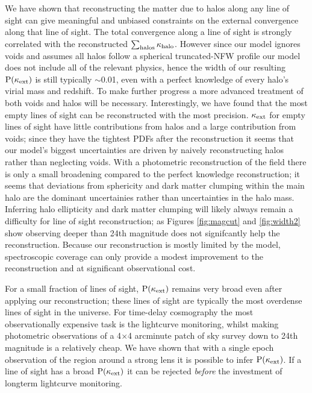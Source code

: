 \documentclass[useAMS,usenatbib]{mn2e}
\begin{document}
We have shown that reconstructing the matter due to halos along any line of sight can give meaningful and unbiased constraints on the external convergence along that line of sight. The total convergence along a line of sight is strongly correlated with the reconstructed $\sum_{\rm halos} \kappa_{\rm halo}$. However since our model ignores voids and assumes all halos follow a spherical truncated-NFW profile our model does not include all of the relevant physics, hence the width of our resulting ${\rm P}(\kappa_{\rm ext})$ is still typically $\sim$0.01, even with a perfect knowledge of every halo's virial mass and redshift. To make further progress a more advanced treatment of both voids and halos will be necessary. Interestingly, we have found that the most empty lines of sight can be reconstructed with the most precision. $\kappa_{\rm ext}$ for empty lines of sight have little contributions from halos and a large contribution from voids; since they have the tightest PDFs after the reconstruction it seems that our model's biggest uncertainties are driven by naively reconstructing halos rather than neglecting voids. With a photometric reconstruction of the field there is only a small broadening compared to the perfect knowledge reconstruction; it seems that deviations from sphericity and dark matter clumping within the main halo are the dominant uncertainies rather than uncertainties in the halo mass. Inferring halo ellipticity and dark matter clumping will likely always remain a difficulty for line of sight reconstruction; as Figures \ref{fig:magcut} and \ref{fig:width2} show observing deeper than 24th magnitude does not signifcantly help the reconstruction. Because our reconstruction is mostly limited by the model, spectroscopic coverage can only provide a modest improvement to the reconstruction and at significant observational cost.

For a small fraction of lines of sight, ${\rm P}(\kappa_{\rm ext})$ remains very broad even after applying our reconstruction; these lines of sight are typically the most overdense lines of sight in the universe. For time-delay cosmography the most observationally expensive task is the lightcurve monitoring, whilst making photometric observations of a 4$\times$4 arcminute patch of sky survey down to 24th magnitude is a relatively cheap. We have shown that with a single epoch observation of the region around a strong lens it is possible to infer ${\rm P}(\kappa_{\rm ext})$. If a line of sight has a broad ${\rm P}(\kappa_{\rm ext})$ it can be rejected {\it before} the investment of longterm lightcurve monitoring.
\end{document}
